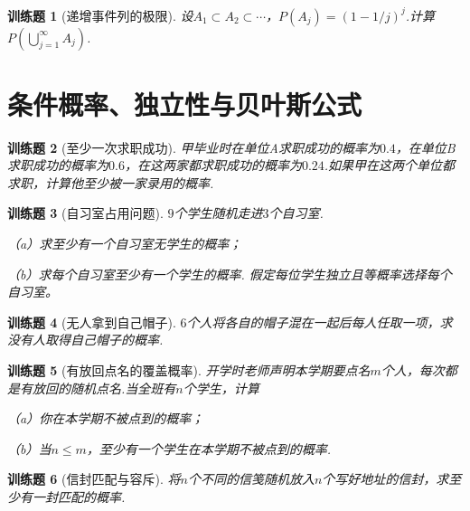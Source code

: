 \documentclass[UTF8,12pt,a4paper,fontset=fandol]{ctexbook}
\newtheorem{exercise}{训练题}[section]
\begin{document}
\begin{exercise}[递增事件列的极限]\label{q:Y1.20}
设$A_1\subset A_2\subset \cdots$，$P(A_j)=(1-1/j)^j$.计算$P(\bigcup\limits_{j = 1}^\infty  {{A_j}} )$.\par{}\end{exercise}

\clearpage\section{条件概率、独立性与贝叶斯公式}

\begin{exercise}[至少一次求职成功]\label{q:Y2.1}
甲毕业时在单位A求职成功的概率为$0.4$，在单位B求职成功的概率为$0.6$，在这两家都求职成功的概率为$0.24$.如果甲在这两个单位都求职，计算他至少被一家录用的概率.\par{}\end{exercise}

\begin{exercise}[自习室占用问题]\label{q:Y2.2}
$9$个学生随机走进$3$个自习室.

（a）求至少有一个自习室无学生的概率；

（b）求每个自习室至少有一个学生的概率. 假定每位学生独立且等概率选择每个自习室。\par{}\end{exercise}

\begin{exercise}[无人拿到自己帽子]\label{q:Y2.3}
$6$个人将各自的帽子混在一起后每人任取一项，求没有人取得自己帽子的概率.\par{}\end{exercise}

\begin{exercise}[有放回点名的覆盖概率]\label{q:Y2.4}
开学时老师声明本学期要点名$m$个人，每次都是有放回的随机点名.当全班有$n$个学生，计算

（a）你在本学期不被点到的概率；

（b）当$n\leqslant m$，至少有一个学生在本学期不被点到的概率.\par{}\end{exercise}

\begin{exercise}[信封匹配与容斥]\label{q:Y2.5}
将$n$个不同的信笺随机放入$n$个写好地址的信封，求至少有一封匹配的概率.\par{}\end{exercise}
\end{document}
